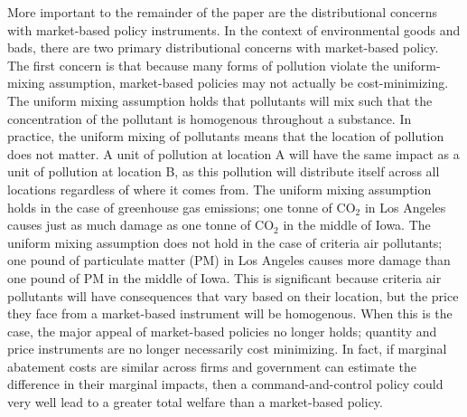 More important to the remainder of the paper are the distributional concerns with market-based policy instruments. In the context of environmental goods and bads, there are two primary distributional concerns with market-based policy. The first concern is that because many forms of pollution violate the uniform-mixing assumption, market-based policies may not actually be cost-minimizing. The uniform mixing assumption holds that pollutants will mix such that the concentration of the pollutant is homogenous throughout a substance. In practice, the uniform mixing of pollutants means that the location of pollution does not matter. A unit of pollution at location A will have the same impact as a unit of pollution at location B, as this pollution will distribute itself across all locations regardless of where it comes from. The uniform mixing assumption holds in the case of greenhouse gas emissions; one tonne of CO$_2$ in Los Angeles causes just as much damage as one tonne of CO$_2$ in the middle of Iowa. The uniform mixing assumption does not hold in the case of criteria air pollutants; one pound of particulate matter (PM) in Los Angeles causes more damage than one pound of PM in the middle of Iowa. This is significant because criteria air pollutants will have consequences that vary based on their location, but the price they face from a market-based instrument will be homogenous. When this is the case, the major appeal of market-based policies no longer holds; quantity and price instruments are no longer necessarily cost minimizing. In fact, if marginal abatement costs are similar across firms and government can estimate the difference in their marginal impacts, then a command-and-control policy could very well lead to a greater total welfare than a market-based policy.

